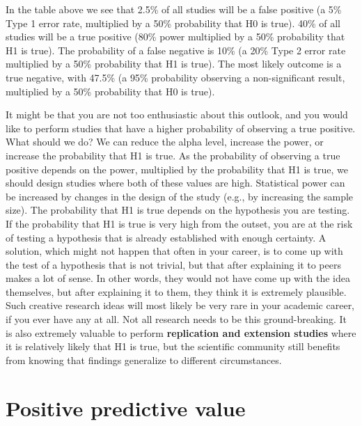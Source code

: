 \documentclass[
]{krantz}
\begin{document}
In the table above we see that 2.5\% of all studies will be a false positive (a 5\% Type 1 error rate,
multiplied by a 50\% probability that H0 is true). 40\% of all studies will be a true positive (80\% power multiplied by a 50\% probability that H1 is true). The probability of a false negative is 10\% (a 20\% Type 2 error rate multiplied by a 50\% probability that H1 is true). The most likely outcome is a true negative, with 47.5\% (a 95\% probability observing a non-significant result, multiplied by a 50\% probability that H0 is true).

It might be that you are not too enthusiastic about this outlook, and you would like to perform studies that have a higher probability of observing a true positive. What should we do? We can reduce the alpha level, increase the power, or increase the probability that H1 is true. As the probability of observing a true positive depends on the power, multiplied by the probability that H1 is true, we should design studies where both of these values are high. Statistical power can be increased by changes in the design of the study (e.g., by increasing the sample size). The probability that H1 is true depends on the hypothesis you are testing. If the probability that H1 is true is very high from the outset, you are at the risk of testing a hypothesis that is already established with enough certainty. A solution, which might not happen that often in your career, is to come up with the test of a hypothesis that is not trivial, but that after explaining it to peers makes a lot of sense. In other words, they would not have come up with the idea themselves, but after explaining it to them, they think it is extremely plausible. Such creative research ideas will most likely be very rare in your academic career, if you ever have any at all. Not all research needs to be this ground-breaking. It is also extremely valuable to perform \textbf{replication and extension studies} where it is relatively likely that H1 is true, but the scientific community still benefits from knowing that findings generalize to different circumstances.

\hypertarget{positive-predictive-value}{%
\section{Positive predictive value}\label{positive-predictive-value}}
\end{document}
